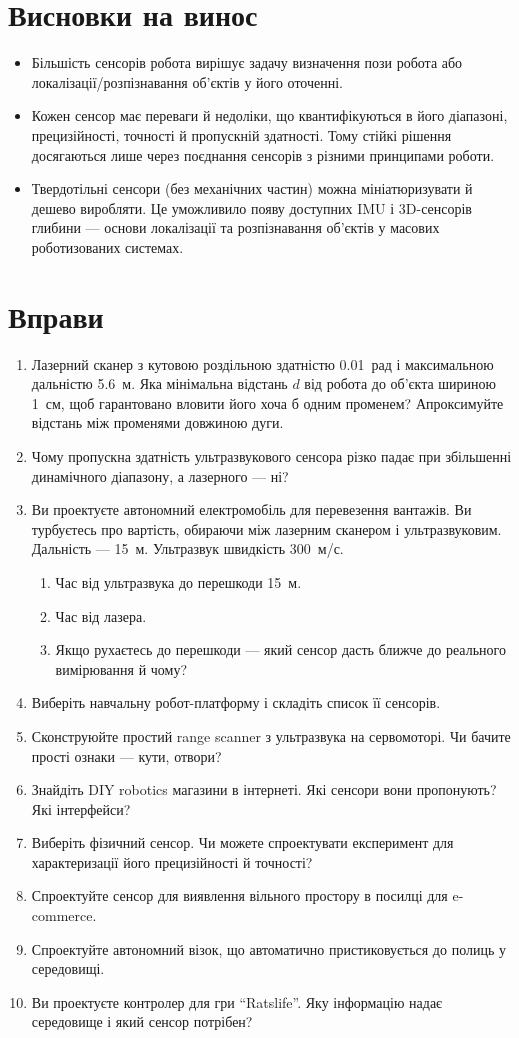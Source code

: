\section*{Висновки на винос}
\begin{itemize}
\item Більшість сенсорів робота вирішує задачу визначення пози робота або локалізації/розпізнавання об'єктів у його оточенні.
\item Кожен сенсор має переваги й недоліки, що квантифікуються в його діапазоні, прецизійності, точності й пропускній здатності. Тому стійкі рішення досягаються лише через поєднання сенсорів з різними принципами роботи.
\item Твердотільні сенсори (без механічних частин) можна мініатюризувати й дешево виробляти. Це уможливило появу доступних IMU і 3D-сенсорів глибини — основи локалізації та розпізнавання об'єктів у масових роботизованих системах.
\end{itemize}

\section*{Вправи}\small
\begin{enumerate}
\item Лазерний сканер з кутовою роздільною здатністю 0.01~рад і максимальною дальністю 5.6~м. Яка мінімальна відстань $d$ від робота до об'єкта шириною 1~см, щоб гарантовано вловити його хоча б одним променем? Апроксимуйте відстань між променями довжиною дуги.
\item Чому пропускна здатність ультразвукового сенсора різко падає при збільшенні динамічного діапазону, а лазерного — ні?
\item Ви проектуєте автономний електромобіль для перевезення вантажів. Ви турбуєтесь про вартість, обираючи між лазерним сканером і ультразвуковим. Дальність — 15~м. Ультразвук швидкість 300~м/с.
\begin{enumerate}
\item Час від ультразвука до перешкоди 15~м.
\item Час від лазера.
\item Якщо рухаєтесь до перешкоди — який сенсор дасть ближче до реального вимірювання й чому?
\end{enumerate}
\item Виберіть навчальну робот-платформу і складіть список її сенсорів.
\item Сконструюйте простий range scanner з ультразвука на сервомоторі. Чи бачите прості ознаки — кути, отвори?
\item Знайдіть DIY robotics магазини в інтернеті. Які сенсори вони пропонують? Які інтерфейси?
\item Виберіть фізичний сенсор. Чи можете спроектувати експеримент для характеризації його прецизійності й точності?
\item Спроектуйте сенсор для виявлення вільного простору в посилці для e-commerce.
\item Спроектуйте автономний візок, що автоматично пристиковується до полиць у середовищі.
\item Ви проектуєте контролер для гри ``Ratslife''. Яку інформацію надає середовище і який сенсор потрібен?
\end{enumerate}\normalsize
